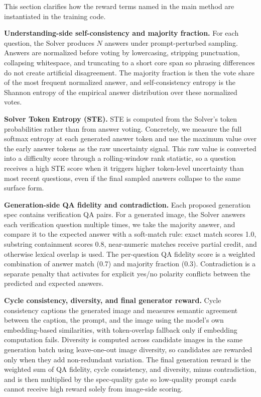 \documentclass[runningheads]{llncs}
\begin{document}
This section clarifies how the reward terms named in the main method are instantiated in the training code.

\noindent\textbf{Understanding-side self-consistency and majority fraction.}
For each question, the Solver produces $N$ answers under prompt-perturbed sampling. Answers are normalized before voting by lowercasing, stripping punctuation, collapsing whitespace, and truncating to a short core span so phrasing differences do not create artificial disagreement. The majority fraction is then the vote share of the most frequent normalized answer, and self-consistency entropy is the Shannon entropy of the empirical answer distribution over these normalized votes.

\noindent\textbf{Solver Token Entropy (STE).}
STE is computed from the Solver's token probabilities rather than from answer voting. Concretely, we measure the full softmax entropy at each generated answer token and use the maximum value over the early answer tokens as the raw uncertainty signal. This raw value is converted into a difficulty score through a rolling-window rank statistic, so a question receives a high STE score when it triggers higher token-level uncertainty than most recent questions, even if the final sampled answers collapse to the same surface form.

\noindent\textbf{Generation-side QA fidelity and contradiction.}
Each proposed generation spec contains verification QA pairs. For a generated image, the Solver answers each verification question multiple times, we take the majority answer, and compare it to the expected answer with a soft-match rule: exact match scores 1.0, substring containment scores 0.8, near-numeric matches receive partial credit, and otherwise lexical overlap is used. The per-question QA fidelity score is a weighted combination of answer match (0.7) and majority fraction (0.3). Contradiction is a separate penalty that activates for explicit yes/no polarity conflicts between the predicted and expected answers.

\noindent\textbf{Cycle consistency, diversity, and final generator reward.}
Cycle consistency captions the generated image and measures semantic agreement between the caption, the prompt, and the image using the model's own embedding-based similarities, with token-overlap fallback only if embedding computation fails. Diversity is computed across candidate images in the same generation batch using leave-one-out image diversity, so candidates are rewarded only when they add non-redundant variation. The final generation reward is the weighted sum of QA fidelity, cycle consistency, and diversity, minus contradiction, and is then multiplied by the spec-quality gate so low-quality prompt cards cannot receive high reward solely from image-side scoring.
\end{document}
